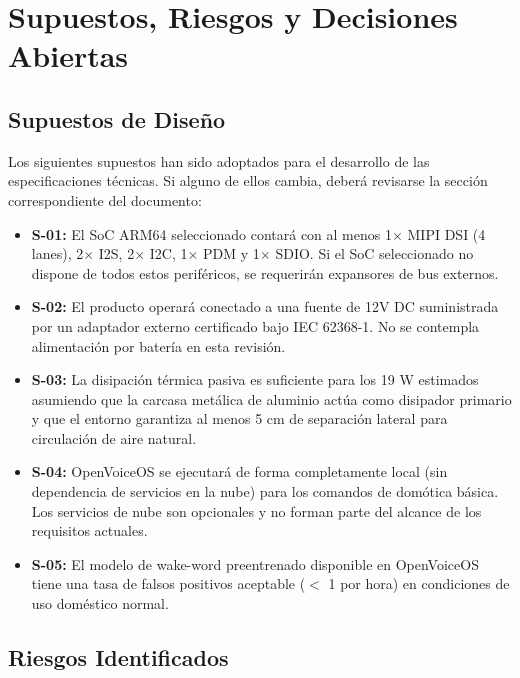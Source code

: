 \documentclass[%
	paper=a4,
	twoside=false,
	parskip=half,
	chapterprefix=false,
	10pt,
	headings=normal,
	bibliography=totoc,
	listof=totoc,
	titlepage=on,
	captions=tableabove,
	draft=false,
]{scrbook}%
\begin{document}
\chapter{Supuestos, Riesgos y Decisiones Abiertas}
\label{chap:supuestos}

\section{Supuestos de Diseño}

Los siguientes supuestos han sido adoptados para el desarrollo de las especificaciones técnicas. Si alguno de ellos cambia, deberá revisarse la sección correspondiente del documento:

\begin{itemize}
    \item \textbf{S-01:} El SoC ARM64 seleccionado contará con al menos 1$\times$ MIPI DSI (4 lanes), 2$\times$ I2S, 2$\times$ I2C, 1$\times$ PDM y 1$\times$ SDIO. Si el SoC seleccionado no dispone de todos estos periféricos, se requerirán expansores de bus externos.
    \item \textbf{S-02:} El producto operará conectado a una fuente de 12V DC suministrada por un adaptador externo certificado bajo IEC 62368-1. No se contempla alimentación por batería en esta revisión.
    \item \textbf{S-03:} La disipación térmica pasiva es suficiente para los 19 W estimados asumiendo que la carcasa metálica de aluminio actúa como disipador primario y que el entorno garantiza al menos 5 cm de separación lateral para circulación de aire natural.
    \item \textbf{S-04:} OpenVoiceOS se ejecutará de forma completamente local (sin dependencia de servicios en la nube) para los comandos de domótica básica. Los servicios de nube son opcionales y no forman parte del alcance de los requisitos actuales.
    \item \textbf{S-05:} El modelo de wake-word preentrenado disponible en OpenVoiceOS tiene una tasa de falsos positivos aceptable ($<$ 1 por hora) en condiciones de uso doméstico normal.
\end{itemize}

\section{Riesgos Identificados}
\end{document}
